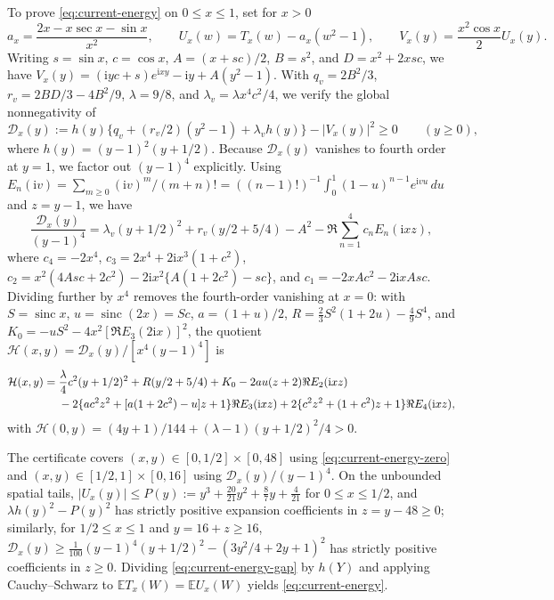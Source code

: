 \documentclass[11pt]{article}
\numberwithin{equation}{section}
\theoremstyle{remark}
\DeclareMathOperator{\sinc}{sinc}
\newcommand{\E}{\mathbb E}
\newcommand{\ii}{\mathrm i}
\begin{document}
To prove \eqref{eq:current-energy} on $0\le x\le1$, set for $x>0$
\[
 a_x=\frac{2x-x\sec x-\sin x}{x^2},\qquad
 U_x(w)=T_x(w)-a_x(w^2-1),\qquad
 V_x(y)=\frac{x^2\cos x}{2}U_x(y).
\]
Writing $s=\sin x$, $c=\cos x$, $A=(x+sc)/2$, $B=s^2$, and $D=x^2+2xsc$, we
have $V_x(y)=(\ii yc+s)e^{\ii xy}-\ii y+A(y^2-1)$. With $q_v=2B^2/3$,
$r_v=2BD/3-4B^2/9$, $\lambda=9/8$, and $\lambda_v=\lambda x^4c^2/4$, we
verify the global nonnegativity of
\begin{equation}\label{eq:current-energy-gap}
 \mathcal D_x(y):=h(y)\{q_v+(r_v/2)(y^2-1)+\lambda_vh(y)\}
                         -|V_x(y)|^2\ge0\qquad(y\ge0),
\end{equation}
where $h(y)=(y-1)^2(y+1/2)$. Because $\mathcal D_x(y)$ vanishes to fourth
order at $y=1$, we factor out $(y-1)^4$ explicitly. Using
$E_n(\ii v)=\sum_{m\ge0}(\ii v)^m/(m+n)!=((n-1)!)^{-1}\int_0^1(1-u)^{n-1}e^{\ii vu}\,du$
and $z=y-1$, we have
\[
 \frac{\mathcal D_x(y)}{(y-1)^4}
 =\lambda_v(y+1/2)^2+r_v(y/2+5/4)-A^2
                  -\Re\sum_{n=1}^4c_nE_n(\ii xz),
\]
where $c_4=-2x^4$, $c_3=2x^4+2\ii x^3(1+c^2)$,
$c_2=x^2(4Asc+2c^2)-2\ii x^2\{A(1+2c^2)-sc\}$, and
$c_1=-2xAc^2-2\ii xAsc$. Dividing further by $x^4$ removes the fourth-order
vanishing at $x=0$: with $S=\sinc x$, $u=\sinc(2x)=Sc$, $a=(1+u)/2$,
$R=\frac23S^2(1+2u)-\frac49S^4$, and $K_0=-uS^2-4x^2[\Re E_3(2\ii x)]^2$,
the quotient $\mathcal H(x,y)=\mathcal D_x(y)/[x^4(y-1)^4]$ is
\begin{align}
 \mathcal H(x,y)={}&\frac\lambda4c^2(y+1/2)^2+R(y/2+5/4)+K_0
       -2au(z+2)\Re E_2(\ii xz)\notag\\
 &-2\{ac^2z^2+[a(1+2c^2)-u]z+1\}\Re E_3(\ii xz)
       +2\{c^2z^2+(1+c^2)z+1\}\Re E_4(\ii xz),
       \label{eq:current-energy-zero}
\end{align}
with $\mathcal H(0,y)=(4y+1)/144+(\lambda-1)(y+1/2)^2/4>0$.

The certificate  covers
$(x,y)\in[0,1/2]\times[0,48]$ using \eqref{eq:current-energy-zero} and
$(x,y)\in[1/2,1]\times[0,16]$ using $\mathcal D_x(y)/(y-1)^4$. On the
unbounded spatial tails, $|U_x(y)|\le P(y):=y^3+\frac{20}{21}y^2+\frac87y+\frac4{21}$
for $0\le x\le1/2$, and $\lambda h(y)^2-P(y)^2$ has strictly positive
expansion coefficients in $z=y-48\ge0$; similarly, for $1/2\le x\le1$ and
$y=16+z\ge16$, $\mathcal D_x(y)\ge\frac1{100}(y-1)^4(y+1/2)^2-(3y^2/4+2y+1)^2$
has strictly positive coefficients in $z\ge0$. Dividing
\eqref{eq:current-energy-gap} by $h(Y)$ and applying Cauchy--Schwarz to
$\E T_x(W)=\E U_x(W)$ yields \eqref{eq:current-energy}.



\end{document}
